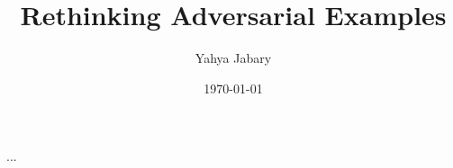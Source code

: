 \documentclass[a4paper, oneside]{discothesis}
\title{Rethinking Adversarial Examples}
\author{Yahya Jabary}
\institute{Computer Engineering and Networks Laboratory \\[2pt]
ETH Zürich}
\date{\today}
\begin{document}
\frontmatter %
\maketitle

\cleardoublepage

\begin{acknowledgements}
	...


		
		
	
	
	
		


	
\end{acknowledgements}
\end{document}
